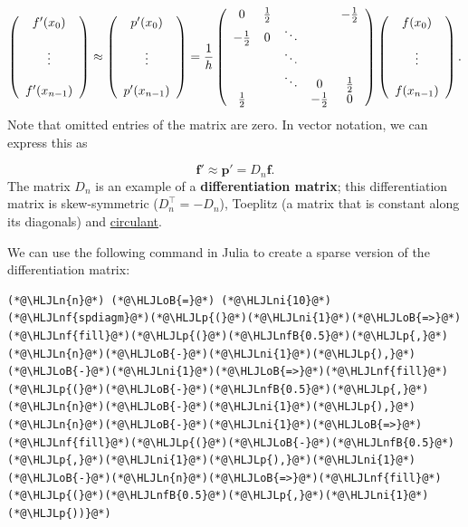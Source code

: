 \documentclass[12pt,a4paper]{article}
\newcommand{\HLJLn}[1]{#1}
\newcommand{\HLJLnf}[1]{\textcolor[RGB]{66,102,213}{#1}}
\newcommand{\HLJLnfB}[1]{\textcolor[RGB]{59,151,46}{#1}}
\newcommand{\HLJLni}[1]{\textcolor[RGB]{59,151,46}{#1}}
\newcommand{\HLJLoB}[1]{\textcolor[RGB]{102,102,102}{\textbf{#1}}}
\newcommand{\HLJLp}[1]{#1}
\begin{document}
\[
\left(
\begin{array}{c c c c c}
f'(x_0) \\
  \\
\vdots  \\
  \\
f'(x_{n-1})
\end{array}
\right) \approx 
\left(
\begin{array}{c c c c c}
p'(x_0) \\
  \\
\vdots  \\
  \\
p'(x_{n-1})
\end{array}
\right) = \frac{1}{h}
\left(
\begin{array}{c c c c c}
0 & \frac{1}{2} &   &   &  -\frac{1}{2} \\
-\frac{1}{2} & 0 & \ddots &  &  \\
   &   & \ddots &  &   \\
   &   & \ddots & 0 &  \frac{1}{2} \\
 \frac{1}{2}  &   &   & -\frac{1}{2} & 0
\end{array}
\right)
\left(
\begin{array}{c c c c c}
f(x_0) \\
  \\
\vdots  \\
  \\
f(x_{n-1})
\end{array}
\right).
\]
Note that omitted entries of the matrix are zero.  In vector notation, we can express this as

\[
\mathbf{f}' \approx \mathbf{p}' = D_n\mathbf{f}.
\]
The matrix $D_n$ is an example of a \textbf{differentiation matrix}; this differentiation matrix is skew-symmetric ($D_n^{\top} = -D_n$), Toeplitz (a matrix that is constant along its diagonals) and \href{https://en.wikipedia.org/wiki/Circulant_matrix}{circulant}.  

We can use the following command in Julia to create a sparse version of the differentiation matrix:


\begin{lstlisting}
(*@\HLJLn{n}@*) (*@\HLJLoB{=}@*) (*@\HLJLni{10}@*)
(*@\HLJLnf{spdiagm}@*)(*@\HLJLp{(}@*)(*@\HLJLni{1}@*)(*@\HLJLoB{=>}@*)(*@\HLJLnf{fill}@*)(*@\HLJLp{(}@*)(*@\HLJLnfB{0.5}@*)(*@\HLJLp{,}@*)(*@\HLJLn{n}@*)(*@\HLJLoB{-}@*)(*@\HLJLni{1}@*)(*@\HLJLp{),}@*)(*@\HLJLoB{-}@*)(*@\HLJLni{1}@*)(*@\HLJLoB{=>}@*)(*@\HLJLnf{fill}@*)(*@\HLJLp{(}@*)(*@\HLJLoB{-}@*)(*@\HLJLnfB{0.5}@*)(*@\HLJLp{,}@*)(*@\HLJLn{n}@*)(*@\HLJLoB{-}@*)(*@\HLJLni{1}@*)(*@\HLJLp{),}@*)(*@\HLJLn{n}@*)(*@\HLJLoB{-}@*)(*@\HLJLni{1}@*)(*@\HLJLoB{=>}@*)(*@\HLJLnf{fill}@*)(*@\HLJLp{(}@*)(*@\HLJLoB{-}@*)(*@\HLJLnfB{0.5}@*)(*@\HLJLp{,}@*)(*@\HLJLni{1}@*)(*@\HLJLp{),}@*)(*@\HLJLni{1}@*)(*@\HLJLoB{-}@*)(*@\HLJLn{n}@*)(*@\HLJLoB{=>}@*)(*@\HLJLnf{fill}@*)(*@\HLJLp{(}@*)(*@\HLJLnfB{0.5}@*)(*@\HLJLp{,}@*)(*@\HLJLni{1}@*)(*@\HLJLp{))}@*)
\end{lstlisting}
\end{document}
